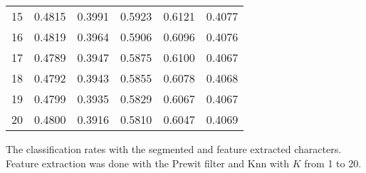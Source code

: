 \begin{minipage}{\linewidth}
\begin{tabular}{r|ccccc}
15         & 0.4815             & 0.3991             & 0.5923                   & 0.6121               & 0.4077          \\
16         & 0.4819             & 0.3964             & 0.5906                   & 0.6096               & 0.4076          \\
17         & 0.4789             & 0.3947             & 0.5875                   & 0.6100               & 0.4067          \\
18         & 0.4792             & 0.3943             & 0.5855                   & 0.6078               & 0.4068          \\
19         & 0.4799             & 0.3935             & 0.5829                   & 0.6067               & 0.4067          \\
20         & 0.4800             & 0.3916             & 0.5810                   & 0.6047               & 0.4069         
\end{tabular}\par
\bigskip
The classification rates with the segmented and feature extracted characters. Feature extraction was done with the Prewit filter and  Knn with $K$ from 1 to 20. 
\end{minipage}







